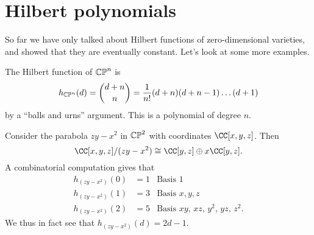 \section{Hilbert polynomials}
So far we have only talked about Hilbert functions
of zero-dimensional varieties, and showed that
they are eventually constant.
Let's look at some more examples.
\begin{example}
	The Hilbert function of $\mathbb{CP}^n$ is
	\[ h_{\mathbb{CP}^n}(d) = \binom{d+n}{n}
	= \frac{1}{n!} (d+n)(d+n-1) \dots (d+1) \]
	by a ``balls and urns'' argument.
	This is a polynomial of degree $n$.
\end{example}
\begin{example}
	Consider the parabola $zy-x^2$ in $\mathbb{CP}^2$
	with coordinates $\CC[x,y,z]$.
	Then 
	\[ \CC[x,y,z] / (zy-x^2) \cong \CC[y,z] \oplus x\CC[y,z]. \]
	A combinatorial computation gives that
	\begin{align*}
		h_{(zy-x^2)}(0) &= 1 & \text{Basis $1$} \\
		h_{(zy-x^2)}(1) &= 3 & \text{Basis $x,y,z$} \\
		h_{(zy-x^2)}(2) &= 5 & \text{Basis $xy$, $xz$, $y^2$, $yz$, $z^2$}.
	\end{align*}
	We thus in fact see that $h_{(zy-x^2)}(d) = 2d-1$.
\end{example}

